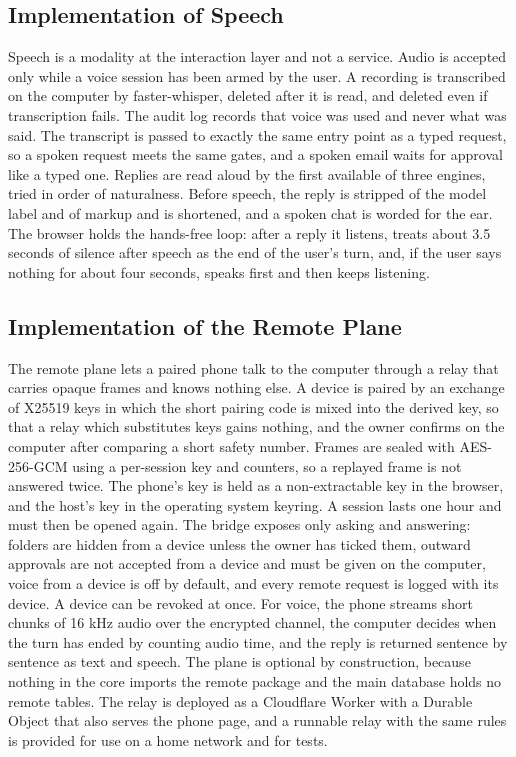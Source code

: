 \documentclass{FastFyp}
\begin{document}
\subsection{Implementation of Speech}
Speech is a modality at the interaction layer and not a service. Audio is accepted only while a voice session has been armed by the user. A recording is transcribed on the computer by faster-whisper, deleted after it is read, and deleted even if transcription fails. The audit log records that voice was used and never what was said. The transcript is passed to exactly the same entry point as a typed request, so a spoken request meets the same gates, and a spoken email waits for approval like a typed one. Replies are read aloud by the first available of three engines, tried in order of naturalness. Before speech, the reply is stripped of the model label and of markup and is shortened, and a spoken chat is worded for the ear. The browser holds the hands-free loop: after a reply it listens, treats about 3.5 seconds of silence after speech as the end of the user's turn, and, if the user says nothing for about four seconds, speaks first and then keeps listening.

\subsection{Implementation of the Remote Plane}
The remote plane lets a paired phone talk to the computer through a relay that carries opaque frames and knows nothing else. A device is paired by an exchange of X25519 keys in which the short pairing code is mixed into the derived key, so that a relay which substitutes keys gains nothing, and the owner confirms on the computer after comparing a short safety number. Frames are sealed with AES-256-GCM using a per-session key and counters, so a replayed frame is not answered twice. The phone's key is held as a non-extractable key in the browser, and the host's key in the operating system keyring. A session lasts one hour and must then be opened again. The bridge exposes only asking and answering: folders are hidden from a device unless the owner has ticked them, outward approvals are not accepted from a device and must be given on the computer, voice from a device is off by default, and every remote request is logged with its device. A device can be revoked at once. For voice, the phone streams short chunks of 16 kHz audio over the encrypted channel, the computer decides when the turn has ended by counting audio time, and the reply is returned sentence by sentence as text and speech. The plane is optional by construction, because nothing in the core imports the remote package and the main database holds no remote tables. The relay is deployed as a Cloudflare Worker with a Durable Object that also serves the phone page, and a runnable relay with the same rules is provided for use on a home network and for tests.
\end{document}

